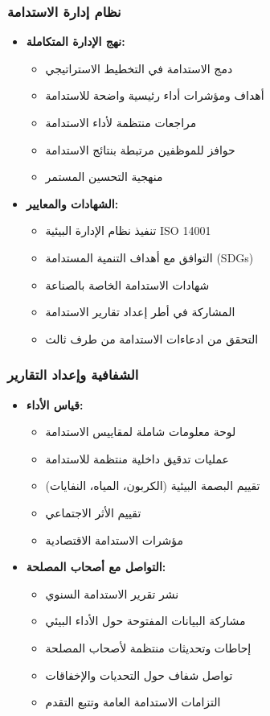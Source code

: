 \subsubsection{نظام إدارة الاستدامة}
\begin{itemize}
    \item \textbf{نهج الإدارة المتكاملة:}
    \begin{itemize}
        \item دمج الاستدامة في التخطيط الاستراتيجي
        \item أهداف ومؤشرات أداء رئيسية واضحة للاستدامة
        \item مراجعات منتظمة لأداء الاستدامة
        \item حوافز للموظفين مرتبطة بنتائج الاستدامة
        \item منهجية التحسين المستمر
    \end{itemize}
    
    \item \textbf{الشهادات والمعايير:}
    \begin{itemize}
        \item تنفيذ نظام الإدارة البيئية ISO 14001
        \item التوافق مع أهداف التنمية المستدامة (SDGs)
        \item شهادات الاستدامة الخاصة بالصناعة
        \item المشاركة في أطر إعداد تقارير الاستدامة
        \item التحقق من ادعاءات الاستدامة من طرف ثالث
    \end{itemize}
\end{itemize}

\subsubsection{الشفافية وإعداد التقارير}
\begin{itemize}
    \item \textbf{قياس الأداء:}
    \begin{itemize}
        \item لوحة معلومات شاملة لمقاييس الاستدامة
        \item عمليات تدقيق داخلية منتظمة للاستدامة
        \item تقييم البصمة البيئية (الكربون، المياه، النفايات)
        \item تقييم الأثر الاجتماعي
        \item مؤشرات الاستدامة الاقتصادية
    \end{itemize}
    
    \item \textbf{التواصل مع أصحاب المصلحة:}
    \begin{itemize}
        \item نشر تقرير الاستدامة السنوي
        \item مشاركة البيانات المفتوحة حول الأداء البيئي
        \item إحاطات وتحديثات منتظمة لأصحاب المصلحة
        \item تواصل شفاف حول التحديات والإخفاقات
        \item التزامات الاستدامة العامة وتتبع التقدم
    \end{itemize}
\end{itemize}

